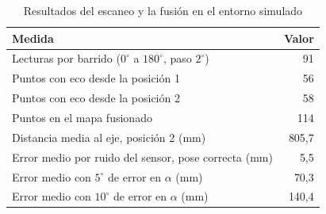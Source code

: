 \begin{table}[htbp]
\caption{Resultados del escaneo y la fusión en el entorno simulado}
\label{tab:resultados-sim}
\begin{tabular}{lr}
\toprule
Medida & Valor \\
\midrule
Lecturas por barrido ($0^\circ$ a $180^\circ$, paso $2^\circ$) & 91 \\
Puntos con eco desde la posición 1 & 56 \\
Puntos con eco desde la posición 2 & 58 \\
Puntos en el mapa fusionado & 114 \\
Distancia media al eje, posición 2 (mm) & 805,7 \\
Error medio por ruido del sensor, pose correcta (mm) & 5,5 \\
Error medio con $5^\circ$ de error en $\alpha$ (mm) & 70,3 \\
Error medio con $10^\circ$ de error en $\alpha$ (mm) & 140,4 \\
\bottomrule
\end{tabular}
\end{table}
